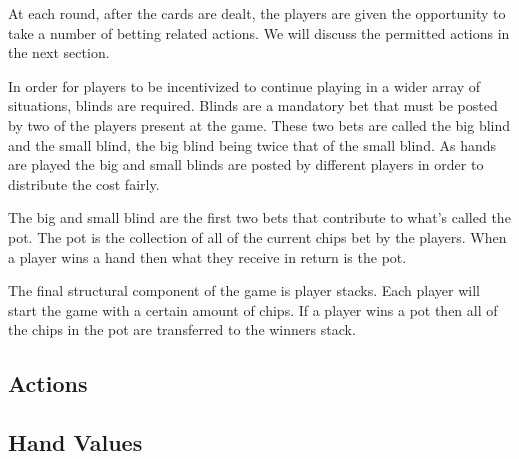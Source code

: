 At each round, after the cards are dealt, the players are given the opportunity to take a number of betting
related actions.
We will discuss the permitted actions in the next section.

In order for players to be incentivized to continue playing in a wider array of situations, blinds are required.
Blinds are a mandatory bet that must be posted by two of the players present at the game.
These two bets are called the big blind and the small blind, the big blind being twice that of the small blind.
As hands are played the big and small blinds are posted by different players in order to distribute the cost fairly.

The big and small blind are the first two bets that contribute to what's called the pot.
The pot is the collection of all of the current chips bet by the players.
When a player wins a hand then what they receive in return is the pot.

The final structural component of the game is player stacks.
Each player will start the game with a certain amount of chips.
If a player wins a pot then all of the chips in the pot are transferred to the winners stack.

\subsection{Actions}\label{subsec:actions}

\subsection{Hand Values}\label{subsec:handValues}

